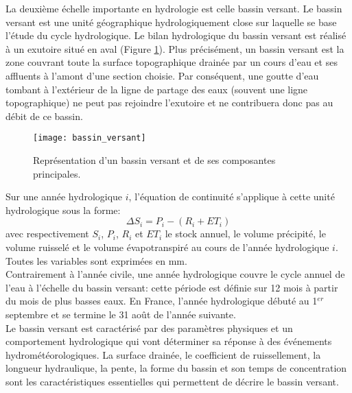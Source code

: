 \noindent La deuxième échelle importante en hydrologie est celle bassin versant. Le bassin versant est une unité géographique hydrologiquement close sur laquelle se base l'étude du cycle hydrologique. Le bilan hydrologique du bassin versant est réalisé à un exutoire situé en aval (Figure \ref{bv}). Plus précisément, un bassin versant est la zone couvrant toute la surface topographique drainée par un cours d'eau et ses affluents à l'amont d'une section choisie. Par conséquent, une goutte d'eau tombant à l'extérieur de la ligne de partage des eaux (souvent une ligne topographique) ne peut pas rejoindre l'exutoire et ne contribuera donc pas au débit de ce bassin. \\

 \begin{figure}[h!]
 \centerline{\texttt{[image: bassin\_versant]}}
 \caption{Représentation d'un bassin versant et de ses composantes principales.}
 \label{bv}
\end{figure}

Sur une année hydrologique $i$, l'équation de continuité s'applique à cette unité hydrologique sous la forme: 
\begin{equation}
\Delta S_{i} = P_{i} - (R_{i}+ET_{i})
\end{equation}
avec respectivement $S_{i}$, $P_{i}$, $R_{i}$ et $ET_{i}$ le stock annuel, le volume précipité, le volume ruisselé et le volume évapotranspiré au cours de l'année hydrologique $i$. Toutes les variables sont exprimées en mm.\\

Contrairement à l'année civile, une année hydrologique couvre le cycle annuel de l'eau à l'échelle du bassin versant: cette période est définie sur 12 mois à partir du mois de plus basses eaux. En France, l'année hydrologique débuté au 1$^{er}$ septembre et se termine le 31 août de l'année suivante.\\

Le bassin versant est caractérisé par des paramètres physiques et un comportement hydrologique qui vont déterminer sa réponse à des événements hydrométéorologiques. La surface drainée, le coefficient de ruissellement, la longueur hydraulique, la pente, la forme du bassin et son temps de concentration sont les caractéristiques essentielles qui permettent de décrire le bassin versant. \\

